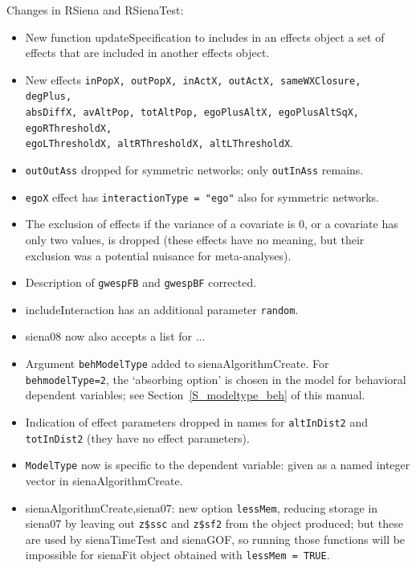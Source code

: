 \documentclass[a4paper,fleqn,11pt]{article}
\newcommand{\+}{\, + \,}
\newcommand{\sfn}[1]{\textsf{#1}}
\begin{document}
\begin{small}
\begin{itemize}
Changes in \textsf{RSiena} and \textsf{RSienaTest}:
\begin{itemize}
   \item New function \sfn{updateSpecification} to includes in an
   effects object a set of effects that are included in another effects object.
   \item New effects \texttt{inPopX, outPopX, inActX, outActX, sameWXClosure, degPlus,\\
     absDiffX, avAltPop, totAltPop, egoPlusAltX, egoPlusAltSqX,
     egoRThresholdX, \\ egoLThresholdX, altRThresholdX, altLThresholdX}.
   \item \texttt{outOutAss} dropped for symmetric networks;
   only \texttt{outInAss} remains.
   \item \texttt{egoX} effect has \texttt{interactionType = "ego"}
   also for symmetric networks.
   \item The exclusion of effects if the variance of a covariate is 0,
     or a covariate has only two values, is dropped (these effects have no meaning,
     but their exclusion was a potential nuisance for meta-analyses).
   \item Description of \texttt{gwespFB} and \texttt{gwespBF} corrected.
   \item \sfn{includeInteraction} has an additional parameter \texttt{random}.
   \item \textsf{siena08} now also accepts a list for ...
   \item Argument \texttt{behModelType} added to \textsf{sienaAlgorithmCreate}.
       For \texttt{behmodelType=2}, the `absorbing option' is chosen
     in the model for behavioral dependent variables;
     see Section~\ref{S_modeltype_beh} of this manual.
   \item Indication of effect parameters dropped in names for
     \texttt{altInDist2} and \texttt{totInDist2} (they have no effect parameters).
   \item \texttt{ModelType} now is specific to the dependent variable:
     given as a named integer vector in \textsf{sienaAlgorithmCreate}.
   \item \sfn{sienaAlgorithmCreate,\textsf{siena07}}: new option \texttt{lessMem},
      reducing storage in \textsf{siena07} by leaving out
      \texttt{z\$ssc} and \texttt{z\$sf2} from the object produced;
      but these are used by
     \textsf{sienaTimeTest} and \textsf{sienaGOF}, so running those functions will be impossible
     for \sfn{sienaFit} object obtained with \texttt{lessMem = TRUE}.

\end{itemize}
\end{itemize}
\end{small}
\end{document}
